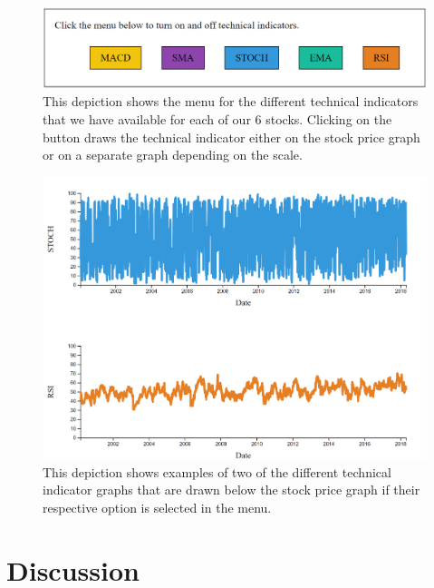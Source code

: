 \documentclass{vgtc}                          %
\begin{document}
\begin{figure}[h]
	\centering
	\includegraphics[scale=0.5]{vis2_menu}
	\caption{This depiction shows the menu for the different technical indicators that we have available for each of our 6 stocks.  Clicking on the button draws the technical indicator either on the stock price graph or on a separate graph depending on the scale.}
\end{figure}

\begin{figure}[h]
	\centering
	\includegraphics[scale=0.4]{vis2_1}
	\caption{This depiction shows examples of two of the different technical indicator graphs that are drawn below the stock price graph if their respective option is selected in the menu.}
\end{figure}




\section{Discussion}


%

%
%
%


\end{document}
